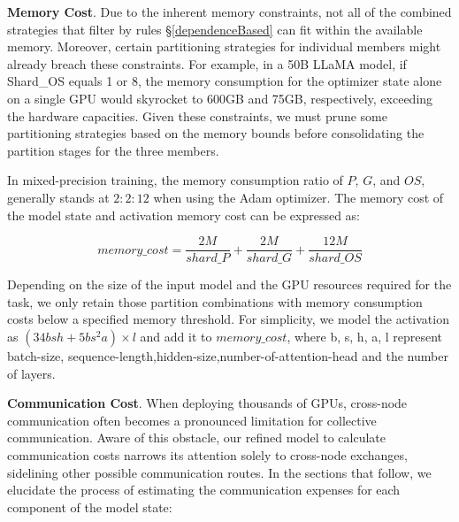 \noindent\textbf{Memory Cost}.
Due to the inherent memory constraints, not all of the combined strategies that filter by rules \S\ref{dependenceBased} can fit within the available memory. Moreover, certain partitioning strategies for individual members might already breach these constraints. For example, in a 50B LLaMA model, if Shard\_OS equals 1 or 8, the memory consumption for the optimizer state alone on a single GPU would skyrocket to 600GB and 75GB, respectively, 
exceeding the hardware capacities.
Given these constraints, we must prune some partitioning strategies based on the memory bounds before consolidating the partition stages for the three members. 

In mixed-precision training, the memory consumption ratio of $P$, $G$, and $OS$, generally stands at $2:2:12$ when using the Adam \cite{Adam} optimizer. The memory cost of the model state and activation memory cost can be expressed as:

\[memory\_cost = \frac{2M}{shard\_P}+ \frac{2M}{shard\_G} + \frac{12M}{shard\_OS} \] 

Depending on the size of the input model and the GPU resources required for the task, we only retain those partition combinations with memory consumption costs below a specified memory threshold. 
For simplicity, we model the activation \cite{ZeRO} as $(34bsh + 5bs^2a) \times l$ and add it to $memory\_cost$, where b, s, h, a, l represent batch-size, sequence-length,hidden-size,number-of-attention-head and the number of layers.

\noindent\textbf{Communication Cost}. When deploying thousands of GPUs, cross-node communication often becomes a pronounced limitation for collective communication. Aware of this obstacle, our refined model to calculate communication costs narrows its attention solely to cross-node exchanges, sidelining other possible communication routes. In the sections that follow, we elucidate the process of estimating the communication expenses for each component of the model state:

